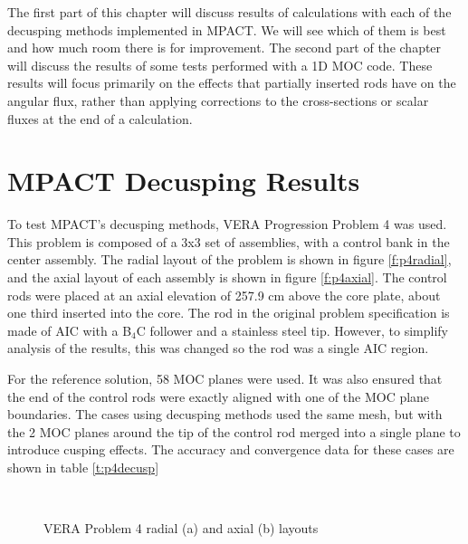 The first part of this chapter will discuss results of calculations with each of the decusping methods implemented in MPACT.  We will see which of them is best and how much room there is for improvement.  The second part of the chapter will discuss the results of some tests performed with a 1D MOC code.  These results will focus primarily on the effects that partially inserted rods have on the angular flux, rather than applying corrections to the cross-sections or scalar fluxes at the end of a calculation.

\section{MPACT Decusping Results}

To test MPACT's decusping methods, VERA Progression Problem 4 \cite{VERAProgressionProblems} was used.  This problem is composed of a 3x3 set of assemblies, with a control bank in the center assembly.  The radial layout of the problem is shown in figure \ref{f:p4radial}, and the axial layout of each assembly is shown in figure \ref{f:p4axial}.  The control rods were placed at an axial elevation of 257.9 cm above the core plate, about one third inserted into the core.  The rod in the original problem specification is made of AIC with a B$_4$C follower and a stainless steel tip.  However, to simplify analysis of the results, this was changed so the rod was a single AIC region.

For the reference solution, 58 MOC planes were used.  It was also ensured that the end of the control rods were exactly aligned with one of the MOC plane boundaries.  The cases using decusping methods used the same mesh, but with the 2 MOC planes around the tip of the control rod merged into a single plane to introduce cusping effects.  The accuracy and convergence data for these cases are shown in table \ref{t:p4decusp}

\begin{figure}\label{f:p4layout}
\centering
{}
~
\caption{VERA Problem 4 radial (a) and axial (b) layouts}\label{f:p4}
\end{figure}

